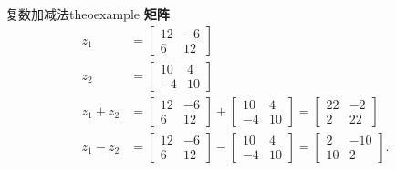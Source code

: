 \begin{myexample}{复数加减法}{theoexample}
\textbf{矩阵}
$$
  \begin{aligned}
    z_{1}       & =\left[\begin{array}{cc}
        12 & -6 \\
        6  & 12
      \end{array}\right]                                                                                     \\
    z_{2}       & =  {\left[\begin{array}{cc}
        10 & 4  \\
        -4 & 10
      \end{array}\right] }                                                                                \\
    z_{1}+z_{2} & =\left[\begin{array}{cc}
        12 & -6 \\
        6  & 12
      \end{array}\right]+\left[\begin{array}{cc}
        10 & 4  \\
        -4 & 10
      \end{array}\right]=\left[\begin{array}{cc}
        22 & -2 \\
        2  & 22
      \end{array}\right]   \\
    z_{1}-z_{2} & =\left[\begin{array}{cc}
        12 & -6 \\
        6  & 12
      \end{array}\right]-\left[\begin{array}{cc}
        10 & 4  \\
        -4 & 10
      \end{array}\right]=\left[\begin{array}{cc}
        2  & -10 \\
        10 & 2
      \end{array}\right] .
  \end{aligned}
$$
\end{myexample}

